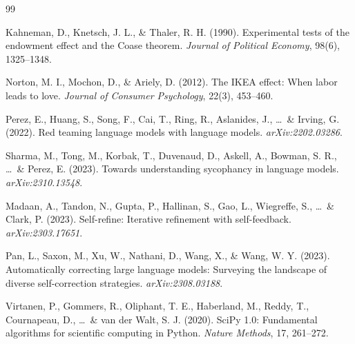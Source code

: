 \documentclass[12pt, letterpaper]{article}
\begin{document}
\begin{thebibliography}{99}

 Kahneman, D., Knetsch, J. L., \& Thaler, R. H. (1990).
  Experimental tests of the endowment effect and the Coase theorem.
  \textit{Journal of Political Economy}, 98(6), 1325--1348.

 Norton, M. I., Mochon, D., \& Ariely, D. (2012).
  The IKEA effect: When labor leads to love.
  \textit{Journal of Consumer Psychology}, 22(3), 453--460.

 Perez, E., Huang, S., Song, F., Cai, T., Ring, R., Aslanides, J.,
  \ldots\ \& Irving, G. (2022). Red teaming language models with language models.
  \textit{arXiv:2202.03286}.

 Sharma, M., Tong, M., Korbak, T., Duvenaud, D., Askell, A.,
  Bowman, S. R., \ldots\ \& Perez, E. (2023). Towards understanding sycophancy in
  language models. \textit{arXiv:2310.13548}.

 Madaan, A., Tandon, N., Gupta, P., Hallinan, S., Gao, L., Wiegreffe,
  S., \ldots\ \& Clark, P. (2023). Self-refine: Iterative refinement with self-feedback.
  \textit{arXiv:2303.17651}.

 Pan, L., Saxon, M., Xu, W., Nathani, D., Wang, X., \& Wang, W. Y.
  (2023). Automatically correcting large language models: Surveying the landscape of
  diverse self-correction strategies. \textit{arXiv:2308.03188}.

 Virtanen, P., Gommers, R., Oliphant, T. E., Haberland, M., Reddy, T.,
  Cournapeau, D., \ldots\ \& van der Walt, S. J. (2020). SciPy 1.0: Fundamental algorithms
  for scientific computing in Python. \textit{Nature Methods}, 17, 261--272.

\end{thebibliography}
\end{document}
